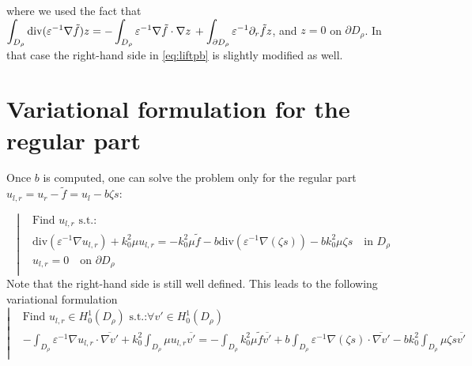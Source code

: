 \documentclass[11pt]{article}
\newcommand{\dsp}{\displaystyle}
\newcommand{\grad}{\nabla}
\DeclareMathOperator{\diver}{{\mathrm{div}}}
\theoremstyle{plain}
\begin{document}
where we used the fact that $\dsp \displaystyle  \int_{D_\rho}  \diver (\varepsilon^{-1}  \grad \tilde{f} ) {z} = - \displaystyle  \int_{D_\rho} \varepsilon^{-1}  \grad \tilde{f} \cdot \grad {z}\, + \int_{\partial D_\rho} \varepsilon^{-1} \partial_r \tilde{f} z$, and $z =0$ on $\partial D_\rho$. In that case the right-hand side in \eqref{eq:liftpb} is slightly modified as well.
\section{Variational formulation for the regular part}

Once $b$ is computed, one can solve the problem only for the regular part $u_{l,r} = u_r - \tilde{f} = u_l - b \zeta s $:

\begin{equation}\label{eq:liftpbreg}
\left|
\begin{aligned}
&\text{Find } u_{l,r} \text{ s.t.:} \\
&\displaystyle\text{div}\left(\varepsilon^{-1}\nabla u_{l,r}  \right) + {k_0^2} \mu  u_{l,r}  = - {k_0^2} \mu  \tilde{f} - b \displaystyle\text{div}\left(\varepsilon^{-1}\nabla (\zeta s)  \right) - b {k_0^2} \mu  \zeta s\quad \text{in } D_\rho \\
& u_{l,r} = 0 \quad \text{on } \partial D_\rho \\
\end{aligned}
\right.
\end{equation}
Note that the right-hand side is still well defined. This leads to the following variational formulation
\begin{equation}\label{FV_lift_reg_part}
\left|
\begin{aligned}
&\text{Find } u_{l,r} \in H^1_0(D_\rho)\text{ s.t.:} \forall v' \in H^1_0(D_\rho) \\
&\displaystyle - \int_{D_\rho} \varepsilon^{-1}\nabla u_{l,r} \cdot \overline{\grad v'} + {k_0^2}\int_{D_\rho}  \mu  u_{l,r}  \overline{v'}= \displaystyle - \int_{D_\rho}  {k_0^2} \mu  \tilde{f} \overline{v'} +b \displaystyle  \int_{D_\rho} \displaystyle \varepsilon^{-1}\nabla (\zeta s)  \cdot \overline{\nabla v'} - b {k_0^2} \displaystyle  \int_{D_\rho} \mu  \zeta s  \overline{v'}\\
\end{aligned}
\right.
\end{equation}
\end{document}
